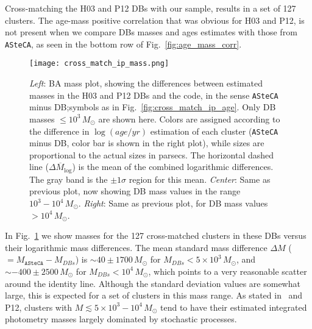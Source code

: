 \documentclass{aa}
\begin{document}
Cross-matching the H03 and P12 DBs with our sample, results in a
set of 127 clusters. The age-mass positive correlation that was obvious for H03
and P12, is not present when we compare DBs masses and ages estimates with
those from \texttt{ASteCA}, as seen in the bottom row of
Fig.~\ref{fig:age_mass_corr}.
%
\begin{figure*}
\texttt{[image: cross\_match\_ip\_mass.png]}
\caption{\emph{Left}: BA mass plot, showing the differences between estimated
masses in the H03 and P12 DBs and the code, in the sense \texttt{ASteCA} minus
DB;\@ symbols as in Fig.~\ref{fig:cross_match_ip_age}.
Only DB masses ${\le}10^3\,M_{\odot}$ are shown here.
Colors are assigned according to the difference in $\log(age/yr)$ estimation of
each cluster (\texttt{ASteCA} minus DB, color bar is shown in the right plot),
while sizes are proportional to the actual sizes in parsecs.
The horizontal dashed line ($\overline{\Delta M_{\log}}$) is the mean of the
combined logarithmic differences. The gray band is the ${\pm}1\sigma$ region for
this mean.
\emph{Center}: Same as previous plot, now showing DB mass values in the range
$10^3-10^4\,M_{\odot}$.
\emph{Right}: Same as previous plot, for DB mass values ${>}10^4\,M_{\odot}$.
}
\label{fig:cross_match_ip_mass}
\end{figure*}
%
In Fig.~\ref{fig:cross_match_ip_mass} we show masses for the 127 cross-matched
clusters in these DBs versus their logarithmic mass differences.
%
The mean standard mass difference $\Delta M$ (${=}M_{\mathtt{ASteCA}}-M_{DBs}$)
is ${\sim}40{\pm}1700\,M_{\odot}$ for $M_{DBs} {<}5{\times}10^3\,M_{\odot}$,
and ${\sim-}400{\pm}2500\,M_{\odot}$ for $M_{DBs} {<}10^4\,M_{\odot}$, which  points
to a very reasonable scatter around the identity line.
%
Although the standard deviation values are somewhat large, this is expected for
a set of clusters in this mass range. As stated in~\cite{Baumgardt_2013} and
P12, clusters with $M{\lesssim}5{\times}10^3 - 10^4\,M_{\odot}$ tend to have
their estimated integrated photometry masses largely dominated by
stochastic processes.
\end{document}
